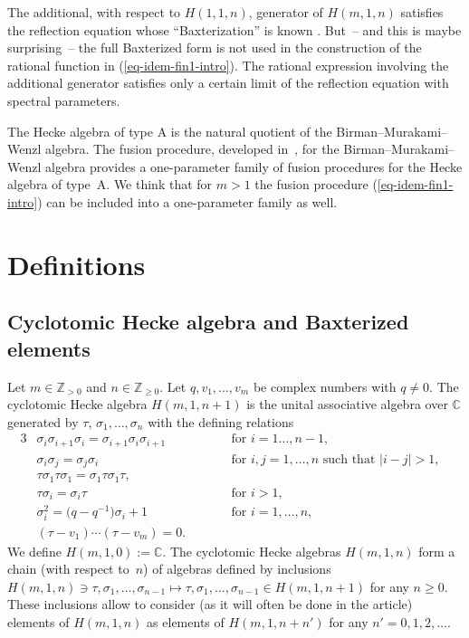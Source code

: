 \documentclass[pdftex]{sigma}
\begin{document}
The additional, with respect to $H(1,1,n)$,  generator of $H(m,1,n)$ satisf\/ies the ref\/lection equation whose ``Baxterization'' is known
\cite{IO2}. But~-- and this is maybe surprising~-- the full Baxterized form is not used in the construction of the rational function in  (\ref{eq-idem-fin1-intro}).
The rational expression involving the additional generator satisf\/ies only a certain limit of the ref\/lection equation with spectral parameters.



The Hecke algebra of type A is the natural quotient of the Birman--Murakami--Wenzl algebra. The fusion procedure, developed in~\cite{IMO3}, for the Birman--Murakami--Wenzl algebra provides a one-parameter family of fusion procedures for the Hecke algebra of type~A. We think that for $m>1$ the
fusion procedure (\ref{eq-idem-fin1-intro}) can be included into a one-parameter family as well.

\section{Def\/initions}\label{sec-def}

\subsection{Cyclotomic Hecke algebra and Baxterized elements}\label{subsec-def}

Let $m\in\mathbb{Z}_{>0}$ and $n\in\mathbb{Z}_{\geq 0}$. Let $q,v_1,\dots,v_m$ be complex numbers with $q\neq 0$.
The cyclotomic Hecke algebra $H(m,1,n+1)$ is the unital associative algebra over $\mathbb{C}$ generated by $\tau$, $\sigma_1,\dots,\sigma_n$ with the def\/ining relations
\begin{alignat*}{3}
& \sigma_i\sigma_{i+1}\sigma_i=\sigma_{i+1}\sigma_i\sigma_{i+1}\qquad  && \text{for $i=1\dots,n-1$},& \nonumber\\
& \sigma_i\sigma_j=\sigma_j\sigma_i \qquad  && \text{for $i,j=1,\dots,n$ such that $|i-j|>1$},& \nonumber\\
& \tau\sigma_1\tau\sigma_1=\sigma_1\tau\sigma_1\tau ,\qquad &&& \nonumber\\
& \tau\sigma_i=\sigma_i\tau \qquad  && \text{for $i>1$},& \nonumber\\
& \sigma_i^2=\big(q-q^{-1}\big)\sigma_i+1 \qquad  && \text{for $i=1,\dots,n$},& \nonumber\\
& (\tau-v_1)\cdots(\tau-v_m)=0  .\qquad &&& %
 \end{alignat*}
We def\/ine $H(m,1,0):=\mathbb{C}$. The cyclotomic Hecke algebras $H(m,1,n)$ form a chain (with respect to~$n$)
of algebras def\/ined by inclusions
$H(m,1,n)\ni \tau,\sigma_1,\dots,\sigma_{n-1}\mapsto  \tau,\sigma_1,\dots,\sigma_{n-1}\in H(m,1,n+1)$ for any $n\geq 0$. These inclusions allow to consider (as it will often be done in the article) elements of $H(m,1,n)$ as elements of $H(m,1,n+n')$ for any $n'=0,1,2,\dots$.
\end{document}
